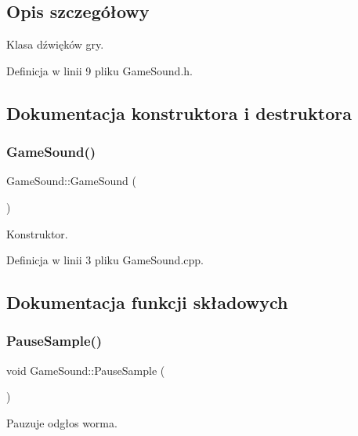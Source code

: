 \subsection{Opis szczegółowy}
Klasa dźwięków gry. 

Definicja w linii 9 pliku Game\+Sound.\+h.



\subsection{Dokumentacja konstruktora i destruktora}
\mbox{\label{class_game_sound_a14feacd320c8a89e68cacf456920c8c1}} 
\subsubsection{\texorpdfstring{Game\+Sound()}{GameSound()}}
{\footnotesize\ttfamily Game\+Sound\+::\+Game\+Sound (\begin{DoxyParamCaption}{ }\end{DoxyParamCaption})}



Konstruktor. 



Definicja w linii 3 pliku Game\+Sound.\+cpp.



\subsection{Dokumentacja funkcji składowych}
\mbox{\label{class_game_sound_a9b64e35e47dd7f06876be460c9cbf67f}} 
\subsubsection{\texorpdfstring{Pause\+Sample()}{PauseSample()}}
{\footnotesize\ttfamily void Game\+Sound\+::\+Pause\+Sample (\begin{DoxyParamCaption}{ }\end{DoxyParamCaption})}



Pauzuje odgłos worma. 



